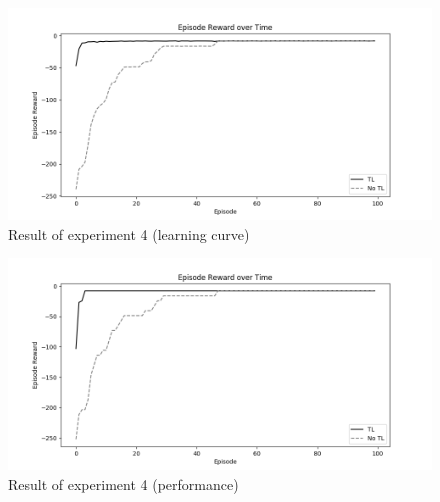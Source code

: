 \begin{figure}[!htb]
\centering
\includegraphics[width=1.0\textwidth]{./figures/experiment4_training}
\caption{Result of experiment 4 (learning curve)}
\label{experiment5_training}
\end{figure}

\begin{figure}[!htb]
\centering
\includegraphics[width=1.0\textwidth]{./figures/experiment4_test}
\caption{Result of experiment 4 (performance)}
\label{experiment5_test}
\end{figure}

